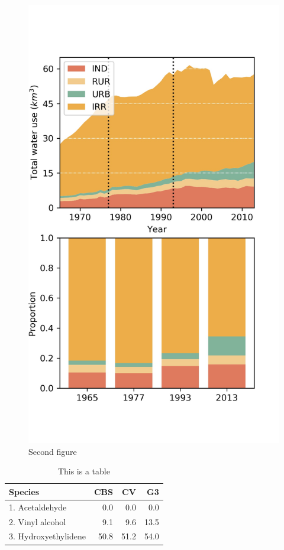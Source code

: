 \documentclass[9pt,twoside,lineno]{pnas-new}
\begin{document}
\begin{figure}
\centering
\includegraphics[width=\textwidth]{../../figures/supplementary_information/sf_wu_sections_stackplot.jpg}
\caption{Second figure}
\end{figure}

\begin{table}\centering
\caption{This is a table}

\begin{tabular}{lrrr}
Species & CBS & CV & G3 \\
\midrule
1. Acetaldehyde & 0.0 & 0.0 & 0.0 \\
2. Vinyl alcohol & 9.1 & 9.6 & 13.5 \\
3. Hydroxyethylidene & 50.8 & 51.2 & 54.0\\
\bottomrule
\end{tabular}
\end{table}
\end{document}
